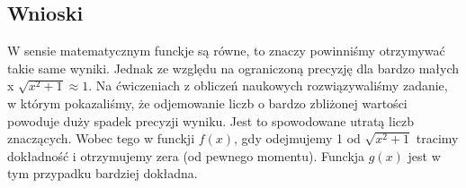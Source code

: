 \documentclass{article}
\begin{document}
\subsection*{Wnioski} W sensie matematycznym funckje są równe, to znaczy powinniśmy otrzymywać takie same wyniki. Jednak ze względu na ograniczoną precyzję dla bardzo małych x $\sqrt{x^2 + 1} \approx 1$. Na ćwiczeniach z obliczeń naukowych rozwiązywaliśmy zadanie, w którym pokazaliśmy, że odjemowanie liczb o bardzo zbliżonej wartości powoduje duży spadek precyzji wyniku. Jest to spowodowane utratą liczb znaczących. Wobec tego w funckji $f(x)$, gdy odejmujemy 1 od $\sqrt{x^2 + 1}$ tracimy dokładność i otrzymujemy zera (od pewnego momentu). Funckja $g(x)$ jest w tym przypadku bardziej dokładna.
\end{document}
